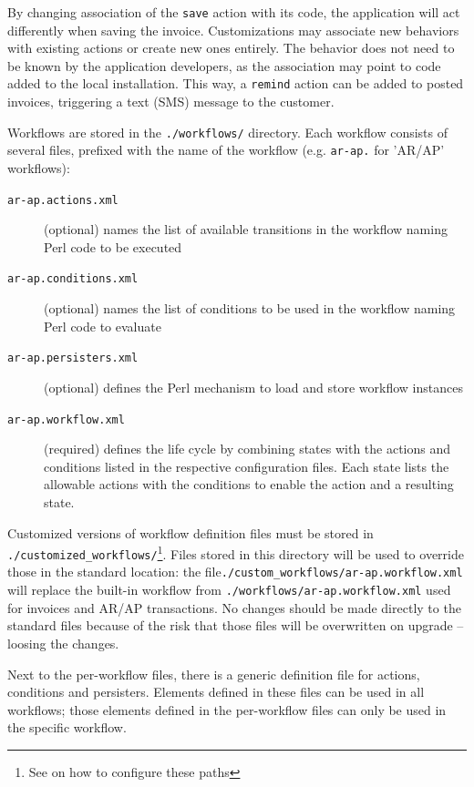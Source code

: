By changing association of the \texttt{save} action with its code, the application will act
differently when saving the invoice.  Customizations may associate new behaviors with existing
actions or create new ones entirely.  The behavior does not need to be known by the application
developers, as the association may point to code added to the local installation.  This way, a
\texttt{remind} action can be added to posted invoices, triggering a text (SMS) message to the
customer.


Workflows are stored in the \texttt{./workflows/} directory.  Each workflow consists of
several files, prefixed with the name of the workflow (e.g. \texttt{ar-ap.} for 'AR/AP' workflows):

\begin{description}
	\item [\texttt{ar-ap.actions.xml}] (optional) names the list of available transitions
	in the workflow naming Perl code to be executed
	\item [\texttt{ar-ap.conditions.xml}] (optional) names the list of conditions to be used
	in the workflow naming Perl code to evaluate
	\item [\texttt{ar-ap.persisters.xml}] (optional) defines the Perl mechanism to load and store
	workflow instances
	\item [\texttt{ar-ap.workflow.xml}] (required) defines the life cycle by combining states with
	the actions and conditions listed in the respective configuration files. Each state lists
	the allowable actions with the conditions to enable the action and a resulting state.
\end{description}

Customized versions of workflow definition files must be stored in \linebreak
 \texttt{./customized\_workflows/}\footnote{See
 	 on how to configure
 these paths}.  Files stored in this directory will be used to override those in
the standard location: the file\linebreak \texttt{./custom\_workflows/ar-ap.workflow.xml} will replace the built-in workflow
from \texttt{./workflows/ar-ap.workflow.xml} used for invoices and \linebreak AR/AP transactions.
No changes should be made directly to the standard files because of the risk that those
files will be overwritten on upgrade -- loosing the changes.

Next to the per-workflow files, there is a generic definition file for actions,
conditions and persisters.  Elements defined in these files can be used in all
workflows; those elements defined in the per-workflow files can only be used
in the specific workflow.

